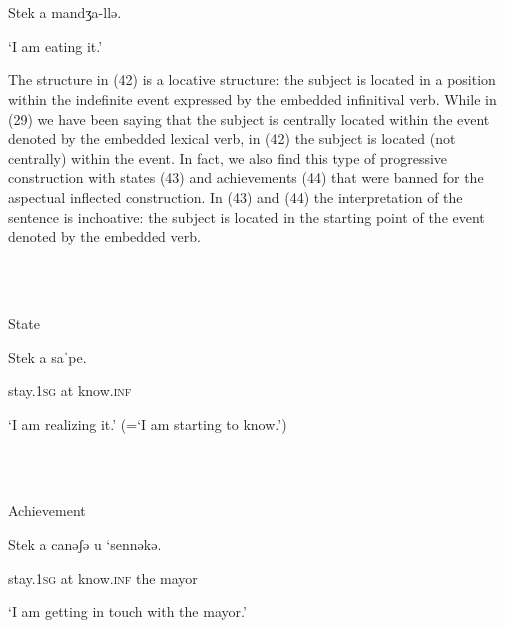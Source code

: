 \documentclass[output=paper]{langsci/langscibook}
\begin{document}
\ea%
    \label{ex:key:42}
    \gll\\
        \\
    \glt
    \z

          Stek a mandʒa-llə.

‘I am eating it.’

\begin{styleListParagraph}
  
 
\end{styleListParagraph}

The structure in (42) is a locative structure: the subject is located in a position within the indefinite event expressed by the embedded infinitival verb. While in (29) we have been saying that the subject is centrally located within the event denoted by the embedded lexical verb, in (42) the subject is located (not centrally) within the event. In fact, we also find this type of progressive construction with states (43) and achievements (44) that were banned for the aspectual inflected construction. In (43) and (44) the interpretation of the sentence is inchoative: the subject is located in the starting point of the event denoted by the embedded verb.

\ea%
    \label{ex:key:43}
    \gll\\
        \\
    \glt
    \z

          State

Stek     a  saˈpe.     

stay.\textsc{1sg} at  know.\textsc{inf}  

‘I am realizing it.’ (=‘I am starting to know.’) 

\ea%
    \label{ex:key:44}
    \gll\\
        \\
    \glt
    \z

          Achievement

Stek     a  canəʃə   u  ‘sennəkə.

stay.\textsc{1sg} at   know.\textsc{inf} the   mayor 

‘I am getting in touch with the mayor.’
\end{document}
